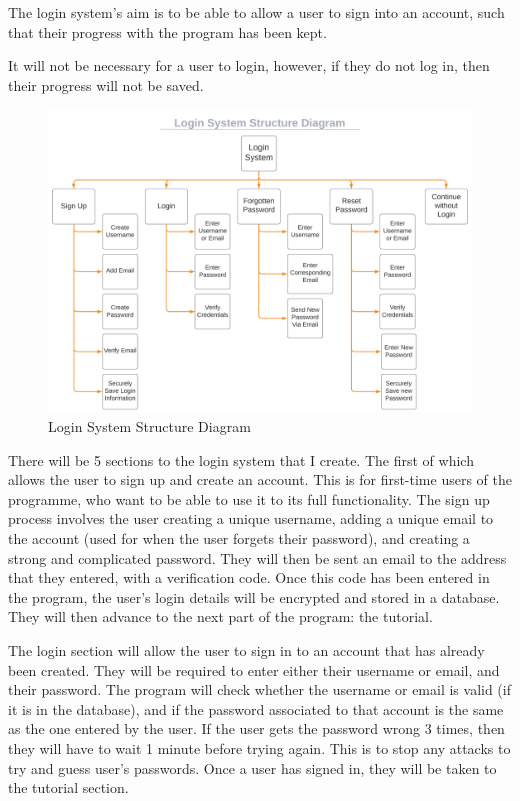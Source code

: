 \documentclass{article}
\begin{document}
The login system's aim is to be able to allow a user to sign into an account, such that their progress with the program has been kept.

It will not be necessary for a user to login, however, if they do not log in, then their progress will not be saved.

\begin{figure}[h]
    \centering
    \captionsetup{justification=centering}
    \includegraphics[scale=0.45]{login-system-structure-diagram}
    \caption{Login System Structure Diagram}
\end{figure}

There will be 5 sections to the login system that I create. The first of which allows the user to sign up and create an account. This is for first-time users of the programme, who want to be able to use it to its full functionality. The sign up process involves the user creating a unique username, adding a unique email to the account (used for when the user forgets their password), and creating a strong and complicated password. They will then be sent an email to the address that they entered, with a verification code. Once this code has been entered in the program, the user's login details will be encrypted and stored in a database. They will then advance to the next part of the program: the tutorial.

The login section will allow the user to sign in to an account that has already been created. They will be required to enter either their username or email, and their password. The program will check whether the username or email is valid (if it is in the database), and if the password associated to that account is the same as the one entered by the user. If the user gets the password wrong 3 times, then they will have to wait 1 minute before trying again. This is to stop any attacks to try and guess user's passwords. Once a user has signed in, they will be taken to the tutorial section.
\end{document}
